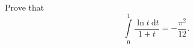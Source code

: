 \documentclass[10pt]{article}
\renewcommand{\d}{\mathrm{d}}
\begin{document}
Prove that
\[
\int\limits_{0}^{1}
\frac{\ln t\ \d t}{1+t} = -\frac{\pi^2}{12}.
\]
\end{document}
